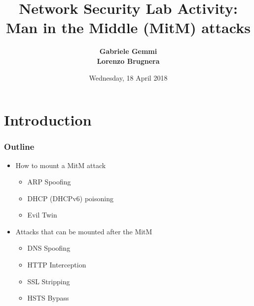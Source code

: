 \documentclass{beamer}
\title[ MitM attacks]{Network Security Lab Activity:\\  Man in the Middle (MitM) attacks}
\author[G. Gemmi, L. Brugnera]{\textbf{Gabriele Gemmi \\ Lorenzo Brugnera}}
\institute[]{
  University of Trento}
\date[18/04/2018]{
 Wednesday, 18 April 2018}
\begin{document}
\begin{frame}
  \titlepage
\end{frame}

%

\section{Introduction}

\begin{frame}
  \frametitle{Outline}
  \begin{itemize}
    \item How to mount a MitM attack
    \begin{itemize}
      \item ARP Spoofing
      \item DHCP (DHCPv6) poisoning
      \item Evil Twin
    \end{itemize}
    \item Attacks that can be mounted after the MitM
    \begin{itemize}
      \item DNS Spoofing
      \item HTTP Interception
      \item SSL Stripping
      \item HSTS Bypass
    \end{itemize}
  \end{itemize}


\end{frame}
\end{document}
